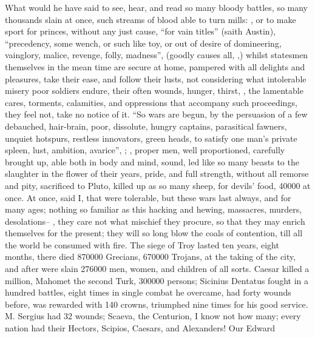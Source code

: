 What would he have said to see, hear, and read so many bloody battles, so many
thousands slain at once, such streams of blood able to turn mills: , or to make sport for princes, without any just cause,
\enquote{for vain titles} (saith Austin), \enquote{precedency, some wench,
or such like toy, or out of desire of domineering, vainglory, malice, revenge,
folly, madness}, (goodly causes all, ,) whilst statesmen themselves in the mean time are secure
at home, pampered with all delights and pleasures, take their ease, and follow
their lusts, not considering what intolerable misery poor soldiers endure,
their often wounds, hunger, thirst, \etc{}, the lamentable cares, torments,
calamities, and oppressions that accompany such proceedings, they feel not,
take no notice of it. \enquote{So wars are begun, by the persuasion of a few debauched,
hair-brain, poor, dissolute, hungry captains, parasitical fawners, unquiet
hotspurs, restless innovators, green heads, to satisfy one man's private
spleen, lust, ambition, avarice}, \etc{}; , proper men, well proportioned, carefully brought
up, able both in body and mind, sound, led like so many
beasts to the slaughter in the flower of their years,
pride, and full strength, without all remorse and pity, sacrificed to Pluto,
killed up as so many sheep, for devils' food, 40\thinspace{}000 at once. At
once, said I, that were tolerable, but these wars last always, and for many
ages; nothing so familiar as this hacking and hewing, massacres, murders,
desolations-- , they care not what mischief
they procure, so that they may enrich themselves for the present; they will so
long blow the coals of contention, till all the world be consumed with fire.
The siege of Troy lasted ten years, eight months, there
died 870\thinspace{}000 Grecians, 670\thinspace{}000 Trojans, at the taking of
the city, and after were slain 276\thinspace{}000 men, women, and children of
all sorts. Caesar killed a million, Mahomet the second
Turk, 300\thinspace{}000 persons; Sicinius Dentatus fought in a hundred
battles, eight times in single combat he overcame, had forty wounds before, was
rewarded with 140 crowns, triumphed nine times for his good service. M. Sergius
had 32 wounds; Scaeva, the Centurion, I know not how many; every nation had
their Hectors, Scipios, Caesars, and Alexanders! Our Edward
